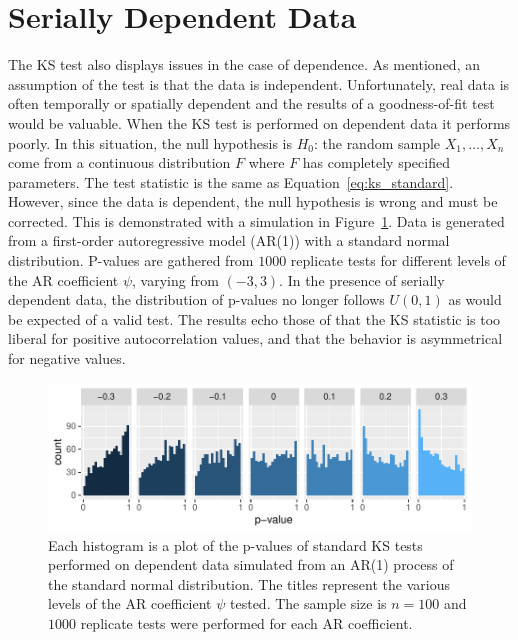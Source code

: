 \documentclass[12pt, letterpaper, titlepage]{article}
\begin{document}
\section{Serially Dependent Data}
\label{sec:dependence}

The KS test also displays issues in the case of dependence. As mentioned, an 
assumption of the test is that the data is independent. Unfortunately, real data
is often temporally or spatially dependent and the results of a goodness-of-fit 
test would be valuable. When the KS test is performed on dependent data it 
performs poorly. In this situation, the null hypothesis is $H_0$: the random 
sample $X_1, \ldots, X_n$ come from a continuous distribution $F$ where $F$ has 
completely specified parameters. The test statistic is the same as 
Equation~\ref{eq:ks_standard}. However, since the data is dependent, the null 
hypothesis is wrong and must be corrected. This is demonstrated with a 
simulation in Figure~\ref{fig:hist_correlation}. Data is generated from a 
first-order autoregressive model (AR(1)) with a standard normal distribution. 
P-values are gathered from $1000$ replicate tests for different levels of the 
AR coefficient $\psi$, varying from $(-3,3)$. In the presence of serially 
dependent data, the distribution of p-values no longer follows $U(0, 1)$ as 
would be expected of a valid test. The results echo those of \citet{Durilleul} 
that the KS statistic is too liberal for positive autocorrelation values, and 
that the behavior is asymmetrical for negative values.

\begin{figure}[tbp]
  \centering
  \includegraphics{hist_correlation}
  \caption{Each histogram is a plot of the p-values of standard KS tests
  performed on dependent data simulated from an AR(1) process of the standard 
  normal distribution. The titles represent the various levels of the AR 
  coefficient $\psi$ tested. The sample size is $n = 100$ and $1000$ replicate 
  tests were performed for each AR coefficient.}
  \label{fig:hist_correlation}
\end{figure}
\end{document}
